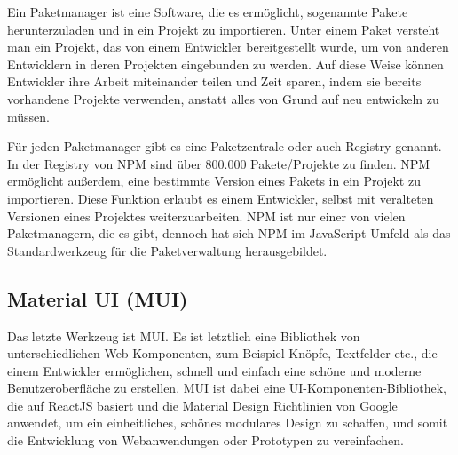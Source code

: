 Ein Paketmanager ist eine Software, die es ermöglicht, sogenannte Pakete herunterzuladen und in ein Projekt zu importieren. Unter einem Paket versteht man ein Projekt, das von einem Entwickler bereitgestellt wurde, um von anderen Entwicklern in deren Projekten eingebunden zu werden. Auf diese Weise können Entwickler ihre Arbeit miteinander teilen und Zeit sparen, indem sie bereits vorhandene Projekte verwenden, anstatt alles von Grund auf neu entwickeln zu müssen.

Für jeden Paketmanager gibt es eine Paketzentrale oder auch Registry genannt. In der Registry von \acs{NPM} sind über 800.000 Pakete/Projekte zu finden. \acs{NPM} ermöglicht außerdem, eine bestimmte Version eines Pakets in ein Projekt zu importieren. Diese Funktion erlaubt es einem Entwickler, selbst mit veralteten Versionen eines Projektes weiterzuarbeiten. \acs{NPM} ist nur einer von vielen Paketmanagern, die es gibt, dennoch hat sich \acs{NPM} im JavaScript-Umfeld als das Standardwerkzeug für die Paketverwaltung herausgebildet.\cite{npm}


\subsection{Material UI (MUI)}
\label{chapter:3-werkzeuge-mui}

Das letzte Werkzeug ist \acf{MUI}. Es ist letztlich eine Bibliothek von unterschiedlichen Web-Komponenten, zum Beispiel Knöpfe, Textfelder etc., die einem Entwickler ermöglichen, schnell und einfach eine schöne und moderne Benutzeroberfläche zu erstellen. \acs{MUI} ist dabei eine \acs{UI}-Komponenten-Bibliothek, die auf ReactJS basiert und die Material Design Richtlinien von Google anwendet, um ein einheitliches, schönes modulares Design zu schaffen, und somit die Entwicklung von Webanwendungen oder Prototypen zu vereinfachen.\cite{materialui}

